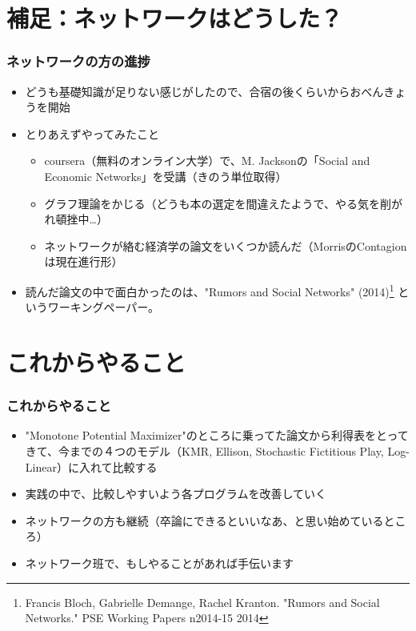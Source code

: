 \documentclass[dvipdfmx,fleqn]{beamer}
\begin{document}
\section{補足：ネットワークはどうした？}
\begin{frame}
\frametitle{ネットワークの方の進捗}
\begin{itemize}\setlength{\parskip}{0.5em}
\item
どうも基礎知識が足りない感じがしたので、合宿の後くらいからおべんきょうを開始
\item とりあえずやってみたこと
　　\begin{itemize}
    \item
    coursera（無料のオンライン大学）で、M. Jacksonの「Social and Economic Networks」を受講（きのう単位取得）
    \item
    グラフ理論をかじる（どうも本の選定を間違えたようで、やる気を削がれ頓挫中…）
    \item
    ネットワークが絡む経済学の論文をいくつか読んだ（MorrisのContagionは現在進行形）
    \end{itemize}
\item
読んだ論文の中で面白かったのは、"Rumors and Social Networks" (2014)\footnote{Francis Bloch, Gabrielle Demange, Rachel Kranton. "Rumors and Social Networks." PSE Working Papers n2014-15 2014} というワーキングペーパー。

\end{itemize}
\end{frame}

\section{これからやること}
\begin{frame}
\frametitle{これからやること}
\begin{itemize}\setlength{\parskip}{0.5em}
\item
"Monotone Potential Maximizer"のところに乗ってた論文から利得表をとってきて、今までの４つのモデル（KMR, Ellison, Stochastic Fictitious Play, Log-Linear）に入れて比較する
\item
実践の中で、比較しやすいよう各プログラムを改善していく
\item
ネットワークの方も継続（卒論にできるといいなあ、と思い始めているところ）
\item
ネットワーク班で、もしやることがあれば手伝います
\end{itemize}
\end{frame}
\end{document}
